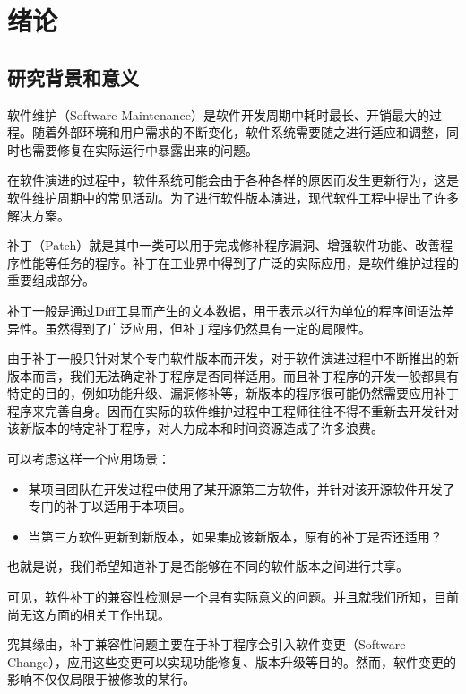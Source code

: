 \chapter{绪论}
\section{研究背景和意义}

软件维护（Software Maintenance）是软件开发周期中耗时最长、开销最大的过程\cite{lehnert2011review}。随着外部环境和用户需求的不断变化，软件系统需要随之进行适应和调整，同时也需要修复在实际运行中暴露出来的问题。

在软件演进的过程中，软件系统可能会由于各种各样的原因而发生更新行为，这是软件维护周期中的常见活动\cite{pigoski1996practical}。为了进行软件版本演进，现代软件工程中提出了许多解决方案。

补丁（Patch）就是其中一类可以用于完成修补程序漏洞、增强软件功能、改善程序性能等任务的程序。补丁在工业界中得到了广泛的实际应用，是软件维护过程的重要组成部分\cite{le2014patch}。

补丁一般是通过Diff工具而产生的文本数据\cite{hunt1976algorithm}，用于表示以行为单位的程序间语法差异性。虽然得到了广泛应用，但补丁程序仍然具有一定的局限性。

由于补丁一般只针对某个专门软件版本而开发，对于软件演进过程中不断推出的新版本而言，我们无法确定补丁程序是否同样适用。而且补丁程序的开发一般都具有特定的目的，例如功能升级、漏洞修补等，新版本的程序很可能仍然需要应用补丁程序来完善自身。因而在实际的软件维护过程中工程师往往不得不重新去开发针对该新版本的特定补丁程序，对人力成本和时间资源造成了许多浪费。

可以考虑这样一个应用场景：

\begin{itemize}
	\item 某项目团队在开发过程中使用了某开源第三方软件，并针对该开源软件开发了专门的补丁以适用于本项目。
	\item 当第三方软件更新到新版本，如果集成该新版本，原有的补丁是否还适用？
\end{itemize}

也就是说，我们希望知道补丁是否能够在不同的软件版本之间进行共享。

可见，软件补丁的兼容性检测是一个具有实际意义的问题。并且就我们所知，目前尚无这方面的相关工作出现。

究其缘由，补丁兼容性问题主要在于补丁程序会引入软件变更（Software Change）\cite{buckley2005towards}，应用这些变更可以实现功能修复、版本升级等目的。然而，软件变更的影响不仅仅局限于被修改的某行。

